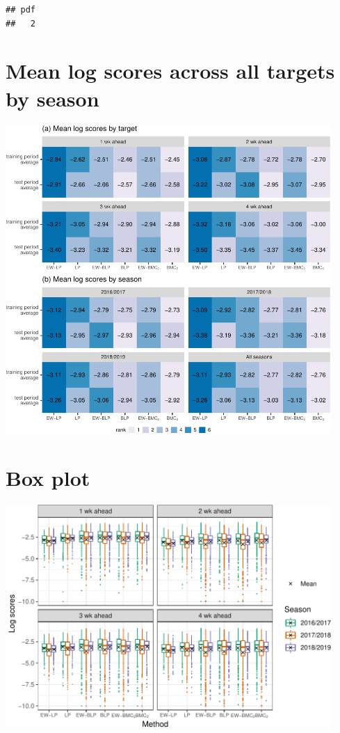 \documentclass[
]{article}
\begin{document}
\begin{verbatim}
## pdf 
##   2
\end{verbatim}

\hypertarget{mean-log-scores-across-all-targets-by-season}{%
\section{Mean log scores across all targets by
season}\label{mean-log-scores-across-all-targets-by-season}}

\includegraphics[width=468px]{plot_calibration_files/figure-latex/lsallyear-1}

\hypertarget{box-plot}{%
\section{Box plot}\label{box-plot}}

\includegraphics[width=468px]{plot_calibration_files/figure-latex/box-1}
\end{document}
